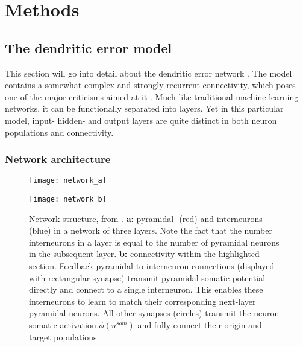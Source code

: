 \chapter{Methods}

\section{The dendritic error model}

This section will go into detail about the dendritic error network \citep{sacramento2018dendritic}. The model contains a
somewhat complex and strongly recurrent connectivity, which poses one of the major criticisms aimed at it
\citep{whittington2019theories}. Much like traditional machine learning networks, it can be functionally separated into
layers. Yet in this particular model, input- hidden- and output layers are quite distinct in both neuron populations and
connectivity.


\subsection{Network architecture}

\begin{figure}[t]
  \centering
  \begin{minipage}{0.5\textwidth}
    \centering
    \texttt{[image: network\_a]}
  \end{minipage}\hfill
  \begin{minipage}{0.4\textwidth}
    \centering
    \texttt{[image: network\_b]}
  \end{minipage}
  \caption{Network structure, from \cite{Haider2021}. \textbf{a:} pyramidal- (red) and interneurons (blue) in a network
    of three layers. Note the fact that the number interneurons in a layer is equal to the number of pyramidal neurons
    in the subsequent layer\protect\footnotemark. \textbf{b:} connectivity within the highlighted section. Feedback
    pyramidal-to-interneuron connections (displayed with rectangular synapse) transmit pyramidal somatic potential
    directly and connect to a single interneuron. This enables these interneurons to learn to match their corresponding
    next-layer pyramidal neurons. All other synapses (circles) transmit the neuron somatic activation $\phi (u^{som})$
    and fully connect their origin and target populations.}
  \label{fig-network}
\end{figure}


